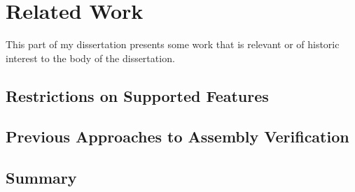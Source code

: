 \chapter{Related Work}
This part of my dissertation presents some work that is relevant
or of historic interest to the body of the dissertation.

\section{Restrictions on Supported Features}
\section{Previous Approaches to Assembly Verification}

\section{Summary}
